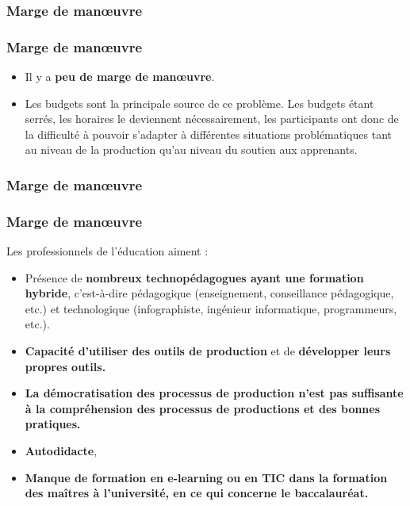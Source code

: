					\subsubsection{Marge de manœuvre} 
						\begin{frame}[allowframebreaks]
						\frametitle{Marge de manœuvre}
                        			
                        			\begin{itemize}
                        			\item Il y a \textbf{peu de marge de manœuvre}. 
                        			\item Les budgets sont la principale source de ce problème. Les budgets étant serrés, les horaires le deviennent nécessairement, les participants ont donc de la difficulté à pouvoir s’adapter à différentes situations problématiques tant au niveau de la production qu’au niveau du soutien aux apprenants.
                        				
						\end{itemize}
						\end{frame}	
						
					\subsubsection{Marge de manœuvre} 
						\begin{frame}[allowframebreaks]
						\frametitle{Marge de manœuvre}
                        			Les professionnels de l'éducation aiment : 
                        			\begin{itemize}
                        			\item Présence de \textbf{nombreux technopédagogues ayant une formation hybride}, c’est-à-dire pédagogique (enseignement, conseillance pédagogique, etc.) et technologique (infographiste, ingénieur informatique, programmeurs, etc.). 
                        			\item \textbf{Capacité d’utiliser des outils de production} et de \textbf{développer leurs propres outils.} 
                        			\item\textbf{ La démocratisation des processus de production n’est pas suffisante à la compréhension des processus de productions et des bonnes pratiques.}
						\item \textbf{Autodidacte}, 
						\item \textbf{Manque de formation en e-learning ou en TIC dans la formation des maîtres à l’université, en ce qui concerne le baccalauréat.}

                        				
						\end{itemize}
						\end{frame}	
						
